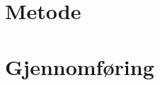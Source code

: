 \documentclass[main.tex]{subfiles}
\begin{document}
\section*{Metode}
\label{sec:2}

\section*{Gjennomføring}
\label{sec:3}
\end{document}
